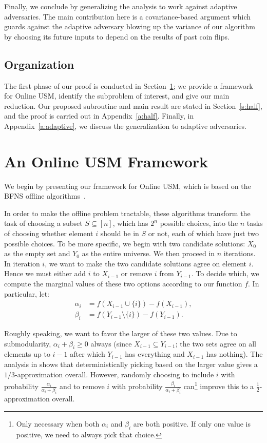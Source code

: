 \documentclass[final,12pt]{colt2018}
\newcommand{\OnlineUSM}{Online USM}
\begin{document}
Finally, we conclude by generalizing the analysis to work against adaptive adversaries. The main contribution here is a covariance-based argument which guards against the adaptive adversary blowing up the variance of our algorithm by choosing its future inputs to depend on the results of past coin flips.

\subsection{Organization}

The first phase of our proof is conducted in Section~\ref{s:framework}; we provide a framework for \OnlineUSM{}, identify the subproblem of interest, and give our main reduction. Our proposed subroutine and main result are stated in Section~\ref{s:half}, and the proof is carried out in Appendix~\ref{a:half}. Finally, in Appendix~\ref{a:adaptive}, we discuss the generalization to adaptive adversaries.

\section{An \OnlineUSM{} Framework}\label{s:framework}

We begin by presenting our framework for \OnlineUSM{}, which is based on the BFNS offline algorithms~\citep{BFNS15}.

In order to make the offline problem tractable, these algorithms transform the task of choosing a subset $S \subseteq [n]$, which has $2^n$ possible choices, into the $n$ tasks of choosing whether element $i$ should be in $S$ or not, each of which have just two possible choices. To be more specific, we begin with two candidate solutions: $X_0$ as the empty set and $Y_0$ as the entire universe. We then proceed in $n$ iterations. In iteration $i$, we want to make the two candidate solutions agree on element $i$. Hence we must either add $i$ to $X_{i-1}$ or remove $i$ from $Y_{i-1}$. To decide which, we compute the marginal values of these two options according to our function $f$. In particular, let:
\begin{align*}
  \alpha_i &= f(X_{i-1} \cup \{i\}) - f(X_{i-1}), \\
  \beta_i &= f(Y_{i-1} \setminus \{i\}) - f(Y_{i-1}).
\end{align*}

Roughly speaking, we want to favor the larger of these two values. Due to submodularity, $\alpha_i + \beta_i \ge 0$ always (since
$X_{i-1} \subseteq Y_{i-1}$; the two sets agree on all elements up to
$i-1$ after which $Y_{i-1}$ has everything and $X_{i-1}$ has
nothing). The 
analysis in \cite{BFNS15} 
shows that deterministically picking based on the larger value gives a $1/3$-approximation overall. However, randomly choosing to include $i$ with probability $\frac{\alpha_i}{\alpha_i + \beta_i}$ and to remove $i$ with probability $\frac{\beta_i}{\alpha_i + \beta_i}$ can\footnote{Only necessary when both $\alpha_i$ and $\beta_i$ are both positive. If only one value is positive, we need to always pick that choice.} improve this to a $\frac12$-approximation overall.
\end{document}

